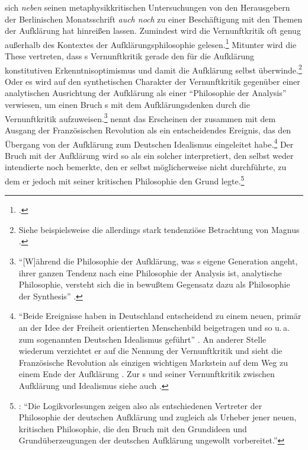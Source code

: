  sich \emph{neben} seinen metaphysikkritischen
Untersuchungen von den Herausgebern der Berlinischen Monatsschrift \emph{auch
noch} zu einer Beschäftigung mit den Themen der Aufklärung hat hinreißen lassen.
Zumindest wird die Vernunftkritik oft genug außerhalb des Kontextes der
Aufklärungsphilosophie
gelesen.\footnote{\cite[Vgl.][47]{Scholz:BeantwortungderFrage:WasisteinaufgeklaerteWeltbuerger2011}.}
Mitunter wird die These vertreten, dass s Vernunftkritik
gerade den für die Aufklärung konstitutiven Erkenntnisoptimismus und damit die
Aufklärung selbst überwinde.\footnote{Siehe beispielsweise die allerdings stark
tendenziöse Betrachtung von Magnus
\textcite{Selling:DieUeberwindungderAufklaerung1942}.} Oder es wird auf den
synthetischen Charakter der Vernunftkritik gegenüber einer analytischen
Ausrichtung der Aufklärung als einer \enquote{Philosophie der Analysis}
verwiesen, um einen Bruch s mit dem Aufklärungsdenken durch
die Vernunftkritik aufzuweisen.\footnote{\enquote{[W]ährend die Philosophie der
Aufklärung, was s eigene Generation angeht, ihrer ganzen
Tendenz nach eine Philosophie der Analysis ist, analytische Philosophie,
versteht sich die  in bewußtem Gegensatz dazu als Philosophie der Synthesis}
\parencite[][34]{Hinske:KantalsHerausforderungandieGegenwart1980}.}
 nennt das
Erscheinen der  zusammen mit dem Ausgang der
Französischen Revolution als ein entscheidendes Ereignis, das den Übergang von
der Aufklärung zum Deutschen Idealismus eingeleitet
habe.\footnote{\enquote{Beide Ereignisse haben in Deutschland entscheidend zu
einem neuen, primär an der Idee der Freiheit orientierten Menschenbild
beigetragen und so u.\,a. zum sogenannten Deutschen Idealismus geführt}
\parencite[][263]{Schneiders:AufklaerungundVorurteilskritik1983}. An anderer
Stelle wiederum verzichtet er auf die Nennung der Vernunftkritik und sieht die
Französische Revolution als einzigen wichtigen Markstein auf dem Weg zu einem
Ende der Aufklärung
\parencite[vgl.][18]{Schneiders:DasZeitalterderAufklaerung2005}. Zur
 s und seiner Vernunftkritik
zwischen Aufklärung und Idealismus siehe auch
\cite{Hinske:KantsVernunftkritik--FruchtderAufklaerungundoderWurzeldesDeutschenIdealismus1993}.}
Der Bruch mit der Aufklärung wird so als ein solcher interpretiert, den
 selbst weder intendierte noch bemerkte, den er selbst
möglicherweise nicht durchführte, zu dem er jedoch mit seiner kritischen
Philosophie den Grund
legte.\footnote{\cite[Vgl.][60]{Hinske:ZwischenAufklaerungundVernunftkritik1993}:
\enquote{Die Logikvorlesungen zeigen  also als
entschiedenen Vertreter der Philosophie der deutschen Aufklärung und zugleich
als Urheber jener neuen, kritischen Philosophie, die den Bruch mit den
Grundideen und Grundüberzeugungen der deutschen Aufklärung ungewollt
vorbereitet.}}

